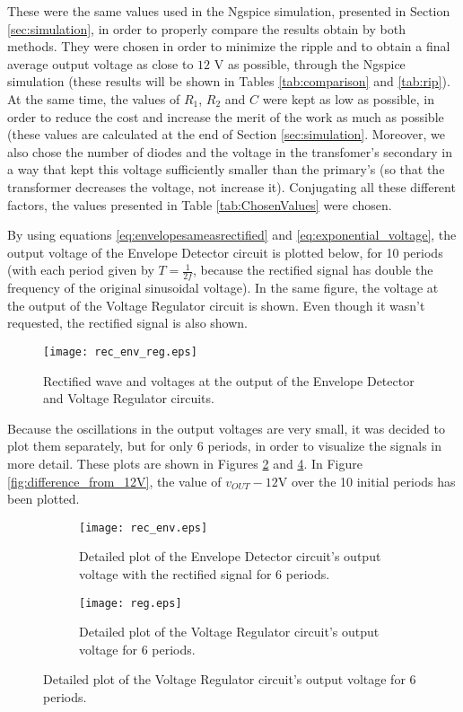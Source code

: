  These were the same values used in the Ngspice simulation, presented in Section \ref{sec:simulation}, in order to properly compare the results obtain by both methods. They were chosen in order to minimize the ripple and to obtain a final average output voltage as close to $12$ V as possible, through the Ngspice simulation (these results will be shown in Tables \ref{tab:comparison} and \ref{tab:rip}). At the same time, the values of $R_1$, $R_2$ and $C$ were kept as low as possible, in order to reduce the cost and increase the merit of the work as much as possible (these values are calculated at the end of Section \ref{sec:simulation}. Moreover, we also chose the number of diodes and the voltage in the transfomer's secondary in a way that kept this voltage sufficiently smaller than the primary's (so that the transformer decreases the voltage, not increase it). Conjugating all these different factors, the values presented in Table \ref{tab:ChosenValues} were chosen.
\par
By using equations \ref{eq:envelopesameasrectified} and \ref{eq:exponential_voltage}, the output voltage of the Envelope Detector circuit is plotted below, for 10 periods (with each period given by $T=\frac{1}{2f}$, because the rectified signal has double the frequency of the original sinusoidal voltage). In the same figure, the voltage at the output of the Voltage Regulator circuit is shown. Even though it wasn't requested, the rectified signal is also shown.


\begin{figure}[H] \centering
  \texttt{[image: rec\_env\_reg.eps]}
  \caption{Rectified wave and voltages at the output of the Envelope Detector and Voltage Regulator circuits.}
  \label{fig:rectified_envelope_regulator_voltages}
\end{figure}

Because the oscillations in the output voltages are very small, it was decided to plot them separately, but for only 6 periods, in order to visualize the signals in more detail. These plots are shown in Figures \ref{fig:rectified_envelope_voltage} and \ref{fig:regulator_voltage}. In Figure \ref{fig:difference_from_12V}, the value of $v_{OUT}-12$V over the 10 initial periods has been plotted.

\begin{figure}[H]
  \begin{subfigure}{.49\linewidth}
    \centering
    \texttt{[image: rec\_env.eps]}
    \footnotesize
    \caption{Detailed plot of the Envelope Detector circuit's output voltage with the rectified signal for 6 periods.}
    \label{fig:rectified_envelope_voltage}
  \end{subfigure}
  \hspace{5mm}
  \begin{subfigure}{.49\linewidth}
    \centering
    \texttt{[image: reg.eps]}  
    \caption{Detailed plot of the Voltage Regulator circuit's output voltage for 6 periods.}
    \label{fig:regulator_voltage}
  \end{subfigure}
\end{figure}

